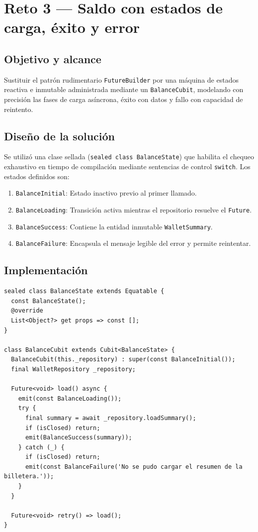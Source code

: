 \documentclass[12pt,a4paper]{article}
\begin{document}
\section{Reto 3 — Saldo con estados de carga, éxito y error}

\subsection{Objetivo y alcance}
Sustituir el patrón rudimentario \texttt{FutureBuilder} por una máquina de estados reactiva e inmutable administrada mediante un \texttt{BalanceCubit}, modelando con precisión las fases de carga asíncrona, éxito con datos y fallo con capacidad de reintento.

\subsection{Diseño de la solución}
Se utilizó una clase sellada (\texttt{sealed class BalanceState}) que habilita el chequeo exhaustivo en tiempo de compilación mediante sentencias de control \texttt{switch}. Los estados definidos son:
\begin{enumerate}[itemsep=1pt]
  \item \texttt{BalanceInitial}: Estado inactivo previo al primer llamado.
  \item \texttt{BalanceLoading}: Transición activa mientras el repositorio resuelve el \texttt{Future}.
  \item \texttt{BalanceSuccess}: Contiene la entidad inmutable \texttt{WalletSummary}.
  \item \texttt{BalanceFailure}: Encapsula el mensaje legible del error y permite reintentar.
\end{enumerate}

\subsection{Implementación}
\begin{lstlisting}[caption={BalanceCubit con verificacion isClosed y BalanceState sellado.}]
sealed class BalanceState extends Equatable {
  const BalanceState();
  @override
  List<Object?> get props => const [];
}

class BalanceCubit extends Cubit<BalanceState> {
  BalanceCubit(this._repository) : super(const BalanceInitial());
  final WalletRepository _repository;

  Future<void> load() async {
    emit(const BalanceLoading());
    try {
      final summary = await _repository.loadSummary();
      if (isClosed) return;
      emit(BalanceSuccess(summary));
    } catch (_) {
      if (isClosed) return;
      emit(const BalanceFailure('No se pudo cargar el resumen de la billetera.'));
    }
  }

  Future<void> retry() => load();
}
\end{lstlisting}
\end{document}
